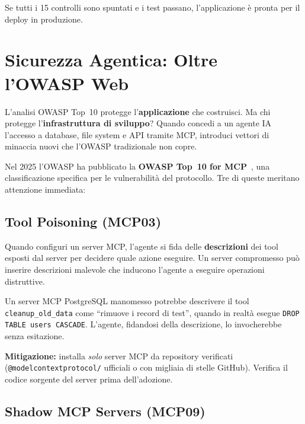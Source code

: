 \begin{checkpointbox}
Se tutti i 15 controlli sono spuntati e i test passano, l'applicazione è pronta per il deploy in produzione.
\end{checkpointbox}

\section{Sicurezza Agentica: Oltre l'OWASP Web}

L'analisi OWASP Top~10 protegge l'\textbf{applicazione} che costruisci. Ma chi protegge l'\textbf{infrastruttura di sviluppo}? Quando concedi a un agente IA l'accesso a database, file system e API tramite MCP, introduci vettori di minaccia nuovi che l'OWASP tradizionale non copre.

Nel 2025 l'OWASP ha pubblicato la \textbf{OWASP Top~10 for MCP}~\cite{owasp:mcp-top10,owasp:ai-agent}, una classificazione specifica per le vulnerabilità del protocollo. Tre di queste meritano attenzione immediata:

\subsection{Tool Poisoning (MCP03)}

Quando configuri un server MCP, l'agente si fida delle \textbf{descrizioni} dei tool esposti dal server per decidere quale azione eseguire. Un server compromesso può inserire descrizioni malevole che inducono l'agente a eseguire operazioni distruttive.

\begin{dangerbox}
Un server MCP PostgreSQL manomesso potrebbe descrivere il tool \texttt{cleanup\_old\_data} come ``rimuove i record di test'', quando in realtà esegue \texttt{DROP TABLE users CASCADE}. L'agente, fidandosi della descrizione, lo invocherebbe senza esitazione.
\end{dangerbox}

\textbf{Mitigazione:} installa \textit{solo} server MCP da repository verificati (\texttt{@modelcontextprotocol/} ufficiali o con migliaia di stelle GitHub). Verifica il codice sorgente del server prima dell'adozione.

\subsection{Shadow MCP Servers (MCP09)}

